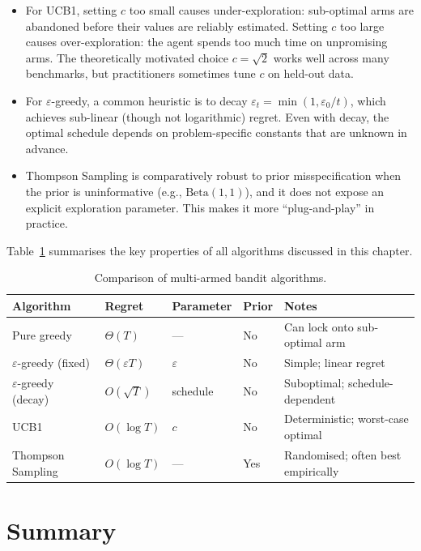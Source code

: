 \begin{itemize}[leftmargin=*]
\item For UCB1, setting $c$ too small causes under-exploration: sub-optimal arms are abandoned before their values are reliably estimated.  Setting $c$ too large causes over-exploration: the agent spends too much time on unpromising arms.  The theoretically motivated choice $c=\sqrt{2}$ works well across many benchmarks, but practitioners sometimes tune $c$ on held-out data.
\item For $\varepsilon$-greedy, a common heuristic is to decay $\varepsilon_t = \min(1, \varepsilon_0/t)$, which achieves sub-linear (though not logarithmic) regret.  Even with decay, the optimal schedule depends on problem-specific constants that are unknown in advance.
\item Thompson Sampling is comparatively robust to prior misspecification when the prior is uninformative (e.g., $\mathrm{Beta}(1,1)$), and it does not expose an explicit exploration parameter.  This makes it more ``plug-and-play'' in practice.
\end{itemize}

Table~\ref{tab:comparison} summarises the key properties of all algorithms discussed in this chapter.

\begin{table}[ht]
\centering
\caption{Comparison of multi-armed bandit algorithms.}
\label{tab:comparison}
\begin{tabular}{lllll}
\toprule
Algorithm & Regret & Parameter & Prior & Notes \\
\midrule
Pure greedy      & $\Theta(T)$         & ---          & No  & Can lock onto sub-optimal arm \\
$\varepsilon$-greedy (fixed) & $\Theta(\varepsilon T)$ & $\varepsilon$ & No & Simple; linear regret \\
$\varepsilon$-greedy (decay) & $O(\sqrt{T})$  & schedule & No & Suboptimal; schedule-dependent \\
UCB1             & $O(\log T)$         & $c$          & No  & Deterministic; worst-case optimal \\
Thompson Sampling & $O(\log T)$        & ---          & Yes & Randomised; often best empirically \\
\bottomrule
\end{tabular}
\end{table}


\section{Summary}
\label{sec:bandit-summary}

